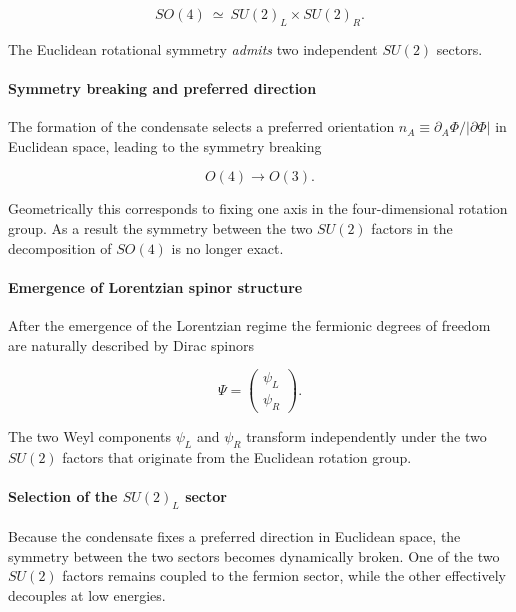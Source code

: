 \documentclass[11pt,a4paper]{article}
\numberwithin{equation}{section}
\begin{document}
\begin{equation}
SO(4)\ \simeq\ SU(2)_L \times SU(2)_R .
\end{equation}

The Euclidean rotational symmetry \emph{admits} two
independent $SU(2)$ sectors.

\paragraph{Symmetry breaking and preferred direction}

The formation of the condensate selects a preferred orientation
$n_A \equiv \partial_A\Phi/|\partial\Phi|$ in Euclidean space,
leading to the symmetry breaking

\begin{equation}
O(4)\rightarrow O(3).
\end{equation}

Geometrically this corresponds to fixing one axis in the
four-dimensional rotation group. As a result the symmetry between the
two $SU(2)$ factors in the decomposition of $SO(4)$ is no longer exact.

\paragraph{Emergence of Lorentzian spinor structure}

After the emergence of the Lorentzian regime the fermionic degrees of
freedom are naturally described by Dirac spinors

\begin{equation}
\Psi =
\begin{pmatrix}
\psi_L \\
\psi_R
\end{pmatrix}.
\end{equation}

The two Weyl components $\psi_L$ and $\psi_R$ transform
independently under the two $SU(2)$ factors that originate from the
Euclidean rotation group.

\paragraph{Selection of the $SU(2)_L$ sector}

Because the condensate fixes a preferred direction in Euclidean
space, the symmetry between the two sectors becomes dynamically
broken. One of the two $SU(2)$ factors remains coupled to the fermion
sector, while the other effectively decouples at low energies.
\end{document}

